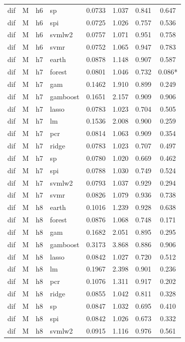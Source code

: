 \begin{ThreePartTable}
\begin{longtable}[t]{llclcccc}
dif & M & h6 & sp & 0.0733 & 1.037 & 0.841 & 0.647\\
dif & M & h6 & spi & 0.0725 & 1.026 & 0.757 & 0.536\\
dif & M & h6 & svmlw2 & 0.0757 & 1.071 & 0.951 & 0.758\\
dif & M & h6 & svmr & 0.0752 & 1.065 & 0.947 & 0.783\\
\addlinespace
dif & M & h7 & earth & 0.0878 & 1.148 & 0.907 & 0.587\\
dif & M & h7 & forest & 0.0801 & 1.046 & 0.732 & 0.086*\\
dif & M & h7 & gam & 0.1462 & 1.910 & 0.899 & 0.249\\
dif & M & h7 & gamboost & 0.1651 & 2.157 & 0.909 & 0.906\\
dif & M & h7 & lasso & 0.0783 & 1.023 & 0.704 & 0.505\\
dif & M & h7 & lm & 0.1536 & 2.008 & 0.900 & 0.259\\
dif & M & h7 & pcr & 0.0814 & 1.063 & 0.909 & 0.354\\
dif & M & h7 & ridge & 0.0783 & 1.023 & 0.707 & 0.497\\
dif & M & h7 & sp & 0.0780 & 1.020 & 0.669 & 0.462\\
dif & M & h7 & spi & 0.0788 & 1.030 & 0.749 & 0.524\\
dif & M & h7 & svmlw2 & 0.0793 & 1.037 & 0.929 & 0.294\\
dif & M & h7 & svmr & 0.0826 & 1.079 & 0.936 & 0.738\\
\addlinespace
dif & M & h8 & earth & 0.1016 & 1.239 & 0.928 & 0.638\\
dif & M & h8 & forest & 0.0876 & 1.068 & 0.748 & 0.171\\
dif & M & h8 & gam & 0.1682 & 2.051 & 0.895 & 0.295\\
dif & M & h8 & gamboost & 0.3173 & 3.868 & 0.886 & 0.906\\
dif & M & h8 & lasso & 0.0842 & 1.027 & 0.720 & 0.512\\
dif & M & h8 & lm & 0.1967 & 2.398 & 0.901 & 0.236\\
dif & M & h8 & pcr & 0.1076 & 1.311 & 0.917 & 0.202\\
dif & M & h8 & ridge & 0.0855 & 1.042 & 0.811 & 0.328\\
dif & M & h8 & sp & 0.0847 & 1.032 & 0.695 & 0.410\\
dif & M & h8 & spi & 0.0842 & 1.026 & 0.673 & 0.332\\
dif & M & h8 & svmlw2 & 0.0915 & 1.116 & 0.976 & 0.561\\

\end{longtable}
\end{ThreePartTable}

